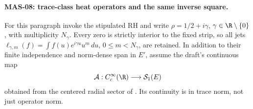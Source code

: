 \paragraph{MAS-08: trace-class heat operators and the same inverse square.}
For this paragraph invoke the stipulated RH and write $\rho=1/2+i\gamma$, $\gamma\in\R\setminus\{0\}$, with multiplicity $N_\gamma$. Every zero is strictly interior to the fixed strip, so all jets
$\ell_{\gamma,m}(f)=\int f(u)e^{i\gamma u}u^m\,du$, $0\le m<N_\gamma$, are retained. In addition to their finite independence and norm-dense span in $E'$, assume the draft's continuous map
\[
 \mathcal A:C_c^\infty(\R)\longrightarrow\mathcal S_1(E)
\]
obtained from the centered radial sector of \cite[Theorem 10.3.2.1(2), (10.3.2.2), pp.~453--454]{masullo}. Its continuity is in trace norm, not just operator norm.

